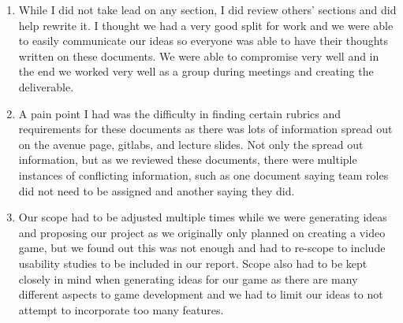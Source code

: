 \documentclass{article}
\begin{document}
\begin{enumerate}
\item While I did not take lead on any section, I did review others' sections and did help rewrite it. I thought we had a very good split for work and we were able to easily communicate our ideas so everyone was able to have their thoughts written on these documents. We were able to compromise very well and in the end we worked very well as a group during meetings and creating the deliverable.
\item A pain point I had was the difficulty in finding certain rubrics and requirements for these documents as there was lots of information spread out on the avenue page, gitlabs, and lecture slides. Not only the spread out information, but as we reviewed these documents, there were multiple instances of conflicting information, such as one document saying team roles did not need to be assigned and another saying they did.
\item Our scope had to be adjusted multiple times while we were generating ideas and proposing our project as we originally only planned on creating a video game, but we found out this was not enough and had to re-scope to include usability studies to be included in our report. Scope also had to be kept closely in mind when generating ideas for our game as there are many different aspects to game development and we had to limit our ideas to not attempt to incorporate too many features.
\end{enumerate} 
\end{document}
